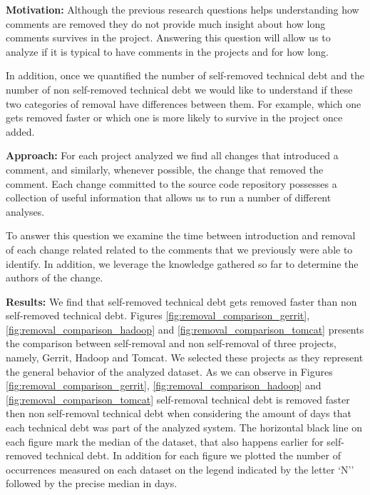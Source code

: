 \vspace{3mm}
\noindent\rqiii
\vspace{3mm}

\noindent \textbf{Motivation:} Although the previous research questions helps understanding how \SATD comments are removed they do not provide much insight about how long \SATD comments survives in the project. Answering this question will allow us to analyze if it is typical to have \SATD comments in the projects and for how long.  

In addition, once we quantified the number of self-removed technical debt and the number of non self-removed technical debt we would like to understand if these two categories of removal have differences between them. For example, which one gets removed faster or which one is more likely to survive in the project once added. 

\vspace{1mm}
\noindent \textbf{Approach:} For each project analyzed we find all changes that introduced a \SATD comment, and similarly, whenever possible, the change that removed the \SATD comment. Each change committed to the source code repository possesses a collection of useful information  that allows us to run a number of different analyses. 

To answer this question we examine the time between introduction and removal of each change related related to the \SATD comments that we previously were able to identify. In addition, we leverage the knowledge gathered so far to determine the authors of the change. 

\vspace{1mm}
\noindent \textbf{Results:} We find that self-removed technical debt gets removed faster than non self-removed technical debt. Figures \ref{fig:removal_comparison_gerrit}, \ref{fig:removal_comparison_hadoop} and \ref{fig:removal_comparison_tomcat} presents the comparison between self-removal and non self-removal of three projects, namely, Gerrit, Hadoop and Tomcat. We selected these projects as they represent the general behavior of the analyzed dataset. As we can observe in Figures \ref{fig:removal_comparison_gerrit}, \ref{fig:removal_comparison_hadoop} and \ref{fig:removal_comparison_tomcat} self-removal technical debt is removed faster then non self-removal technical debt when considering the amount of days that each technical debt was part of the analyzed system. The horizontal black line on each figure mark the median of the dataset, that also happens earlier for self-removed technical debt. In addition for each figure we plotted the number of occurrences measured on each dataset on the legend indicated by the letter `N'' followed by the precise median in days.

